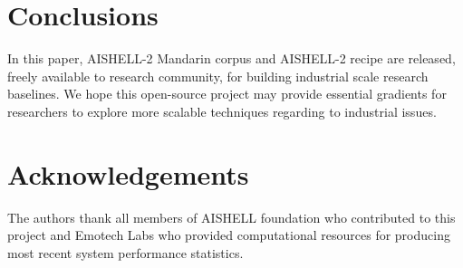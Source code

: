 \documentclass[a4paper]{article}
\begin{document}
% 

\section{Conclusions}

In this paper, AISHELL-2 Mandarin corpus and AISHELL-2 recipe are released,
freely available to research community, for building industrial scale research
baselines. We hope this open-source project may provide essential gradients for
researchers to explore more scalable techniques regarding to industrial
issues. 

\section{Acknowledgements}

The authors thank all members of AISHELL foundation who contributed to this
project and Emotech Labs who provided computational resources for producing most recent system performance statistics.





\end{document}
